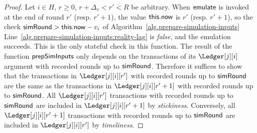 \restateLemConsistency*
\begin{proof}
  Let $i \in H$, $r \geq 0$, $r + \Delta_v < r' < R$ be arbitrary.
  When $\textsf{emulate}$ is invoked at the end of round $r'$ (resp. $r' + 1$),
  the value $\textsf{this}.\textsf{now}$
  is $r'$ (resp. $r' + 1$), so the check $\textsf{simRound} > \textsf{this}.\textsf{now} - v_i$ of Algorithm~\ref{alg.prepare-simulation-inputs}
  Line~\ref{alg.prepare-simulation-inputs:reality-lag} is \emph{false}, and the emulation
  succeeds. This is the only stateful check in this function.
  The result of the function $\textsf{prepSimInputs}$ only depends on the transactions of
  its $\Ledger[j][i]$ argument with recorded rounds up to $\textsf{simRound}$.
  Therefore it suffices to show that the transactions in
  $\Ledger[j][i][r']$ with recorded rounds up to $\textsf{simRound}$ are the same
  as the transactions in $\Ledger[j][i][r' + 1]$ with recorded rounds up to $\textsf{simRound}$.
  All $\Ledger[j][i][r']$ transactions with recorded rounds up to $\textsf{simRound}$
  are included in $\Ledger[j][i][r' + 1]$ by \emph{stickiness}.
  Conversely, all $\Ledger[j][i][r' + 1]$ transactions with recorded rounds up to $\textsf{simRound}$
  are included in $\Ledger[j][i][r']$ by \emph{timeliness}.\Qed
\end{proof}

